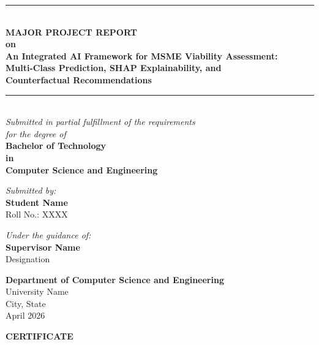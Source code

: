 \documentclass[12pt,a4paper]{report}
\begin{document}
\begin{titlepage}
\centering
\vspace*{0.5cm}

\rule{\textwidth}{1.5pt}\\[0.4cm]
{\LARGE\bfseries MAJOR PROJECT REPORT\\[0.3cm]}
{\large\bfseries on\\[0.3cm]}
{\LARGE\bfseries An Integrated AI Framework for MSME Viability Assessment:\\[0.2cm]
Multi-Class Prediction, SHAP Explainability, and\\[0.2cm]
Counterfactual Recommendations\\[0.2cm]}
\rule{\textwidth}{1.5pt}\\[1.5cm]

{\large\textit{Submitted in partial fulfillment of the requirements\\for the degree of}\\[0.5cm]}
{\Large\bfseries Bachelor of Technology\\in\\Computer Science and Engineering\\[1.2cm]}

{\large\textit{Submitted by:}\\[0.3cm]}
{\Large\bfseries Student Name\\}
{\large Roll No.: XXXX\\[0.8cm]}

{\large\textit{Under the guidance of:}\\[0.3cm]}
{\Large\bfseries Supervisor Name\\}
{\large Designation\\[1.2cm]}


{\Large\bfseries Department of Computer Science and Engineering\\[0.2cm]}
{\large University Name\\}
{\large City, State\\[0.5cm]}
{\large April 2026\\}

\end{titlepage}

\newpage
\thispagestyle{empty}
\begin{center}
{\Large\bfseries CERTIFICATE\\[1cm]}
\end{center}
\end{document}
